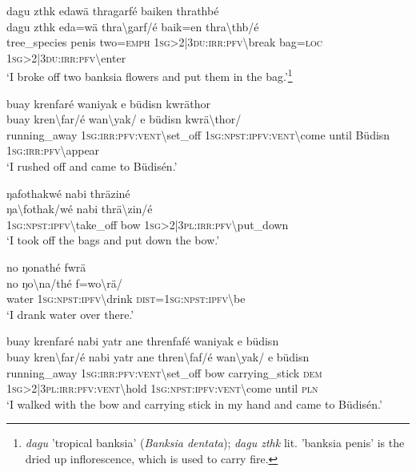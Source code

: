 \ea\label{ex:13:a1413}
dagu zthk edawä thragarfé baiken thrathbé\\
\gll dagu	zthk	eda=wä	thra{\textbackslash}garf/é	baik=en	thra{\textbackslash}thb/é\\
     tree\_species	penis	two=\textsc{emph}	1\textsc{sg}>2|3\textsc{du}:\textsc{irr}:\textsc{pfv}{\textbackslash}break	bag=\textsc{loc}	1\textsc{sg}>2|3\textsc{du}:\textsc{irr}:\textsc{pfv}{\textbackslash}enter\\
\glt `I broke off two banksia flowers and put them in the bag.'\footnote{\textit{dagu} 'tropical banksia' (\textit{Banksia dentata}); \textit{dagu zthk} lit. 'banksia penis' is the dried up inflorescence, which is used to carry fire.}
\z

\ea\label{ex:13:a1414}
buay krenfaré waniyak e büdisn kwräthor\\
\gll buay	kren{\textbackslash}far/é	wan{\textbackslash}yak/	e	büdisn	kwrä{\textbackslash}thor/\\
     running\_away	1\textsc{sg}:\textsc{irr}:\textsc{pfv}:\textsc{vent}{\textbackslash}set\_off	1\textsc{sg}:\textsc{npst}:\textsc{ipfv}:\textsc{vent}{\textbackslash}come	until	Büdisn	1\textsc{sg}:\textsc{irr}:\textsc{pfv}{\textbackslash}appear\\
\glt `I rushed off and came to Büdisén.'
\z

\ea\label{ex:13:a1416}
ŋafothakwé nabi thräziné\\
\gll ŋa{\textbackslash}fothak/wé	nabi	thrä{\textbackslash}zin/é\\
     1\textsc{sg}:\textsc{npst}:\textsc{ipfv}{\textbackslash}take\_off	bow	1\textsc{sg}>2|3\textsc{pl}:\textsc{irr}:\textsc{pfv}{\textbackslash}put\_down\\
\glt `I took off the bags and put down the bow.'
\z

\ea\label{ex:13:a1418}
no ŋonathé fwrä\\
\gll no	ŋo{\textbackslash}na/thé	f=wo{\textbackslash}rä/\\
     water	1\textsc{sg}:\textsc{npst}:\textsc{ipfv}{\textbackslash}drink	\textsc{dist}=1\textsc{sg}:\textsc{npst}:\textsc{ipfv}{\textbackslash}be\\
\glt `I drank water over there.'
\z

\ea\label{ex:13:a1419}
buay krenfaré nabi yatr ane  threnfafé waniyak e büdisn\\
\gll buay	kren{\textbackslash}far/é	nabi	yatr	ane	thren{\textbackslash}faf/é	wan{\textbackslash}yak/	e	büdisn\\
     running\_away	1\textsc{sg}:\textsc{irr}:\textsc{pfv}:\textsc{vent}{\textbackslash}set\_off	bow	carrying\_stick	\textsc{dem}	1\textsc{sg}>2|3\textsc{pl}:\textsc{irr}:\textsc{pfv}:\textsc{vent}{\textbackslash}hold	1\textsc{sg}:\textsc{npst}:\textsc{ipfv}:\textsc{vent}{\textbackslash}come	until	\textsc{pln}\\
\glt `I walked with the bow and carrying stick in my hand and came to Büdisén.'
\z

